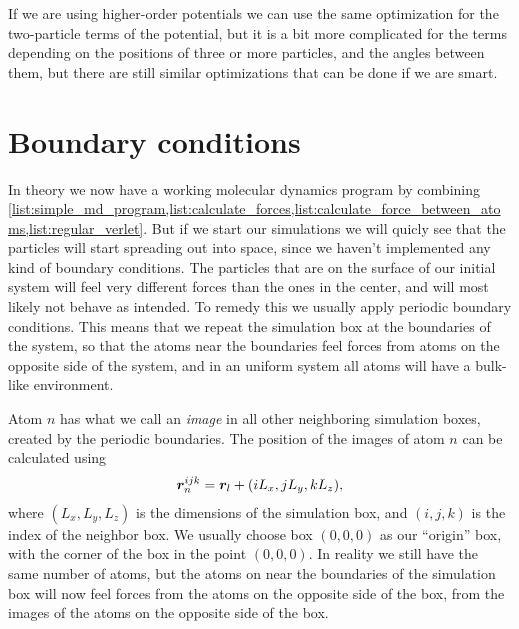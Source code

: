 If we are using higher-order potentials we can use the same optimization for the two-particle terms of the potential, but it is a bit more complicated for the terms depending on the positions of three or more particles, and the angles between them, but there are still similar optimizations that can be done if we are smart.




\section{Boundary conditions}
In theory we now have a working molecular dynamics program by combining \cref{list:simple_md_program,list:calculate_forces,list:calculate_force_between_atoms,list:regular_verlet}. But if we start our simulations we will quicly see that the particles will start spreading out into space, since we haven't implemented any kind of boundary conditions. The particles that are on the surface of our initial system will feel very different forces than the ones in the center, and will most likely not behave as intended. To remedy this we usually apply periodic boundary conditions. This means that we repeat the simulation box at the boundaries of the system, so that the atoms near the boundaries feel forces from atoms on the opposite side of the system, and in an uniform system all atoms will have a bulk-like environment. 

Atom $n$ has what we call an \emph{image} in all other neighboring simulation boxes, created by the periodic boundaries. The position of the images of atom $n$ can be calculated using
\begin{align}
    \boldsymbol{r}_n^{ijk} = \boldsymbol{r}_l + (iL_x, jL_y, kL_z),
    \label{eq:pbc_positions}
\end{align}
where $(L_x, L_y, L_z)$ is the dimensions of the simulation box, and $(i, j, k)$ is the index of the neighbor box. We usually choose box $(0,0,0)$ as our ``origin'' box, with the corner of the box in the point $(0,0,0)$. In reality we still have the same number of atoms, but the atoms on near the boundaries of the simulation box will now feel forces from the atoms on the opposite side of the box, from the images of the atoms on the opposite side of the box.

